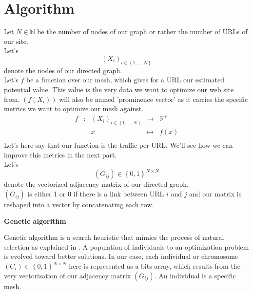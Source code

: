 \documentclass{iSWAGArticle}
\begin{document}
  \section{Algorithm}
  Let $N \in \mathbb{N}$ be the number of nodes of our graph or rather the number of URLs of our site.
  \\\newline
  Let's $$\left(X_i\right)_{i \in \left\{1,...,N\right\}}$$ denote the nodes of our directed graph.
  \\\newline
  Let's $f$ be a function over our mesh, which gives for a URL our estimated potential value. This value is the
  very data we want to optimize our web site from. $\left(f\left(X_i\right)\right)$ will also be named 'prominence vector' as
  it carries the specific metrics we want to optimize our mesh against.
  \begin{equation}
  \begin{array}{ccccc}
  f & : & \left(X_i\right)_{i \in \left\{1,...,N\right\}} & \to & \mathbb{R}^{+} \\
  & & x & \mapsto & f(x) \\
  \end{array}
  \end{equation}
  Let's here say that our function is the traffic per URL. We'll see how we can improve this metrics in the next part.
  \\\newline
  Let's $$\left(G_{ij}\right)  \in \left\{0,1\right\}^{N\times N}$$ denote the vectorized adjacency matrix of our directed graph.
  \\\newline
  $\left(G_{ij}\right)$ is either 1 or 0 if there is a link between URL $i$ and $j$ and our matrix is reshaped into a vector by concatenating each row.
  \begin{center}
  \textbf{\large Genetic algorithm}
  \end{center}
  Genetic algorithm is a search heuristic that mimics the process of natural selection as explained in \cite{gen_algo}. 
  A population of individuals to an optimization problem is evolved toward better solutions. 
  In our case, each individual or chromosome $\left(C_{i}\right)  \in \left\{0,1\right\}^{N\times N}$ here is represented as a bits array, which results from the very vectorization of
  our adjacency matrix $\left(G_{ij}\right)$. An individual is a specific mesh. 
\end{document}
